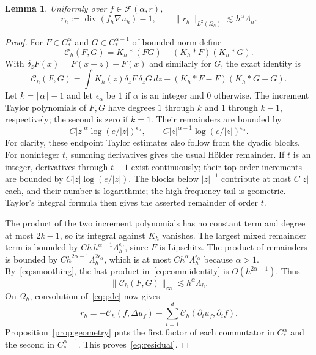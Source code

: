 \documentclass[11pt]{article}
\newtheorem{lemma}[theorem]{Lemma}
\theoremstyle{remark}
\newcommand{\cF}{\mathcal F}
\newcommand{\diver}{\operatorname{div}}
\newcommand{\norm}[1]{\lVert #1\rVert}
\newcommand{\abs}[1]{\lvert #1\rvert}
\begin{document}
\begin{lemma}\label{lem:residual}
Uniformly over $f\in\cF(\alpha,r)$,
\begin{equation}\label{eq:residual}
 r_h:=\diver(f_h\nabla u_h)-1,
 \qquad \norm{r_h}_{L^2(\Omega_h)}\lesssim h^\alpha\Lambda_h.
\end{equation}
\end{lemma}
\begin{proof}
For $F\in C_*^\alpha$ and $G\in C_*^{\alpha-1}$ of bounded norm define
\[
 \mathcal C_h(F,G)=K_h*(FG)-(K_h*F)(K_h*G).
\]
With $\delta_zF(x)=F(x-z)-F(x)$ and similarly for $G$, the exact identity is
\begin{equation}\label{eq:commidentity}
 \mathcal C_h(F,G)=\int K_h(z)\delta_zF\,\delta_zG\,dz
 -(K_h*F-F)(K_h*G-G).
\end{equation}
Let $k=\lceil\alpha\rceil-1$ and let $\epsilon_\alpha$ be $1$ if $\alpha$ is an integer and $0$ otherwise. The increment Taylor polynomials of $F,G$ have degrees $1$ through $k$ and $1$ through $k-1$, respectively; the second is zero if $k=1$. Their remainders are bounded by
\[
 C\abs{z}^\alpha\log(e/\abs{z})^{\epsilon_\alpha},
 \qquad C\abs{z}^{\alpha-1}\log(e/\abs{z})^{\epsilon_\alpha}.
\]
For clarity, these endpoint Taylor estimates also follow from the dyadic blocks. For noninteger $t$, summing derivatives gives the usual H\"older remainder. If $t$ is an integer, derivatives through $t-1$ exist continuously; their top-order increments are bounded by $C\abs{z}\log(e/\abs{z})$. The blocks below $\abs{z}^{-1}$ contribute at most $C\abs{z}$ each, and their number is logarithmic; the high-frequency tail is geometric. Taylor's integral formula then gives the asserted remainder of order $t$.

The product of the two increment polynomials has no constant term and degree at most $2k-1$, so its integral against $K_h$ vanishes. The largest mixed remainder term is bounded by $Ch\,h^{\alpha-1}\Lambda_h^{\epsilon_\alpha}$, since $F$ is Lipschitz. The product of remainders is bounded by $Ch^{2\alpha-1}\Lambda_h^{2\epsilon_\alpha}$, which is at most $Ch^\alpha\Lambda_h^{\epsilon_\alpha}$ because $\alpha>1$. By~\eqref{eq:smoothing}, the last product in~\eqref{eq:commidentity} is $O(h^{2\alpha-1})$. Thus
\begin{equation}\label{eq:commbound}
 \norm{\mathcal C_h(F,G)}_\infty\lesssim h^\alpha\Lambda_h.
\end{equation}
On $\Omega_h$, convolution of~\eqref{eq:pde} now gives
\[
 r_h=-\mathcal C_h(f,\Delta u_f)
      -\sum_{i=1}^d\mathcal C_h(\partial_i u_f,\partial_i f).
\]
Proposition~\ref{prop:geometry} puts the first factor of each commutator in $C_*^\alpha$ and the second in $C_*^{\alpha-1}$. This proves~\eqref{eq:residual}.
\end{proof}
\end{document}
